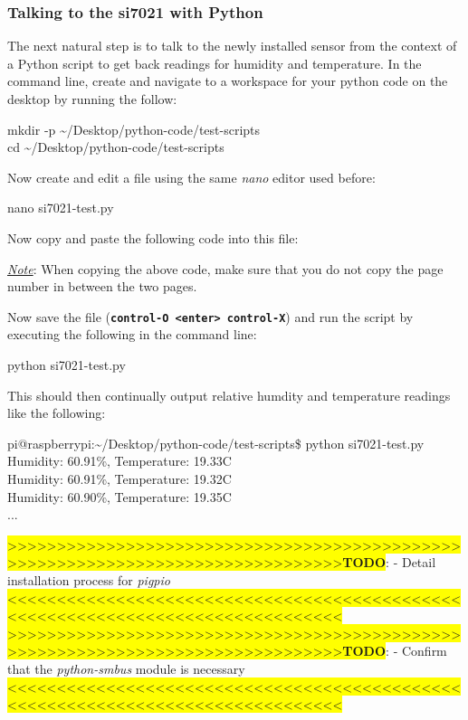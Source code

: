 \documentclass{article}
\newcommand*{\myfont}{\fontfamily{pcr}\selectfont}
\newcommand{\codeb}[2]{
  \begin{tcolorbox}[width=\textwidth,colback={SpringGreen},title={#1},colbacktitle=DarkGreen,coltitle=SpringGreen]
    \myfont
    #2
  \end{tcolorbox}
} %
\newcommand{\outputb}[2]{
  \begin{tcolorbox}[width=\textwidth,colback={light-gray},title={#1},colbacktitle=gray,coltitle=light-gray]
    \myfont
    #2
  \end{tcolorbox}
} %
\newcommand{\todo}[1]{\newline\noindent\colorbox{Yellow}{>>>>>>>>>>>>>>>>>>>>>>>>>>>>>>>>>>>>>>>>>>>>>>>>>>>>>>>>>>>>>>>>>>>>>>>>>>>>>>>>}\newline\colorbox{Yellow}{\textbf{TODO}}: - #1 \newline \colorbox{Yellow}{<<<<<<<<<<<<<<<<<<<<<<<<<<<<<<<<<<<<<<<<<<<<<<<<<<<<<<<<<<<<<<<<<<<<<<<<<<<<<<<<}\newline}
\begin{document}
  \subsubsection{Talking to the si7021 with Python}
    The next natural step is to talk to the newly installed sensor from the context of a Python script to get back readings for humidity and temperature. In the command line, create and navigate to a workspace for your python code on the desktop by running the follow:
    \codeb{Create and navigate to your workspace}
    {
      mkdir -p \textasciitilde/Desktop/python-code/test-scripts \\
      cd \textasciitilde/Desktop/python-code/test-scripts
    }
    \newline
    \noindent
    Now create and edit a file using the same \textit{nano} editor used before:
    \codeb{Create si7021 Python testing script file}
    {
      nano si7021-test.py
    }
    \newline
    \noindent
    Now copy and paste the following code into this file:
    
    \underline{\textit{Note}}: When copying the above code, make sure that you do not copy the page number in between the two pages.

    \newline

    \newline

    \noindent
    Now save the file (\textbf{\texttt{control-O <enter> control-X}}) and run the script by executing the following in the command line:
    \codeb{Run the test script for si7021 sensor}{python si7021-test.py}
    This should then continually output relative humdity and temperature readings like the following:
    \outputb{Test script output for si7021 sensor}
    {
      pi@raspberrypi:\textasciitilde/Desktop/python-code/test-scripts\$ python si7021-test.py        \\
      Humidity: 60.91\%, Temperature: 19.33\degree C                                   \\
      Humidity: 60.91\%, Temperature: 19.32\degree C                                   \\
      Humidity: 60.90\%, Temperature: 19.35\degree C                                   \\
      ...
    }

    \todo{Detail installation process for \textit{pigpio}}
    \todo{Confirm that the \textit{python-smbus} module is necessary}
\end{document}

